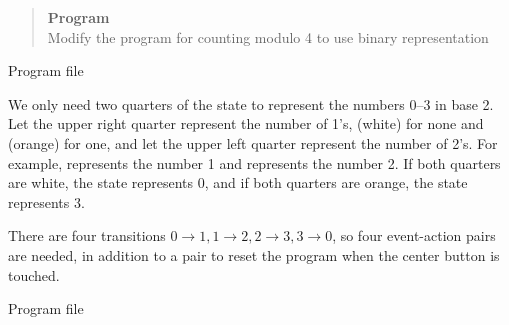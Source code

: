\newpage

\begin{quote}
\textbf{Program}\\
Modify the program for counting modulo 4 to use binary representation
\end{quote}

{\raggedleft \hfill Program file }

We only need two quarters of the state to represent the numbers
0--3 in base 2.
Let the upper right quarter represent the number of 1's,
 (white) for none and  (orange) for one,
and let the upper left quarter represent the number of 2's.
For example,  represents the number 1 and
 represents the number 2.
If both quarters are white, the state represents 0, and if both
quarters are orange, the state represents 3.

There are four transitions $0\rightarrow 1, 1\rightarrow 2, 2
\rightarrow 3, 3\rightarrow 0$, so four event-action pairs
are needed, in addition to a pair to reset the program
when the center button is touched.

\medskip


\medskip


{\raggedleft \hfill Program file }



